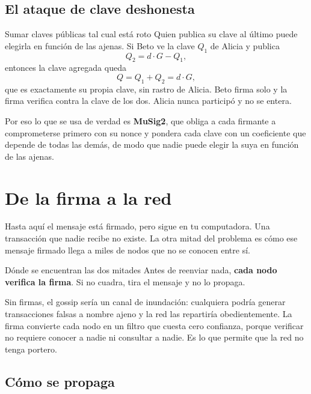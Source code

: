\documentclass[11pt,a4paper]{article}
\theoremstyle{definition}
\theoremstyle{plain}
\theoremstyle{remark}
\begin{document}
\subsection{El ataque de clave deshonesta}

\begin{aviso}{Sumar claves públicas tal cual está roto}
Quien publica su clave al último puede elegirla en función de las ajenas. Si Beto
ve la clave $Q_1$ de Alicia y publica
\[
  Q_2 = d\cdot G - Q_1,
\]
entonces la clave agregada queda
\[
  Q = Q_1 + Q_2 = d\cdot G,
\]
que es exactamente su propia clave, sin rastro de Alicia. Beto firma solo y la
firma verifica contra la clave de los dos. Alicia nunca participó y no se entera.
\end{aviso}

Por eso lo que se usa de verdad es \textbf{MuSig2}, que obliga a cada firmante a
comprometerse primero con su nonce y pondera cada clave con un coeficiente que
depende de todas las demás, de modo que nadie puede elegir la suya en función de
las ajenas.

\section{De la firma a la red}\label{sec:puente}

Hasta aquí el mensaje está firmado, pero sigue en tu computadora. Una transacción
que nadie recibe no existe. La otra mitad del problema es cómo ese mensaje
firmado llega a miles de nodos que no se conocen entre sí.

\begin{clave}{Dónde se encuentran las dos mitades}
Antes de reenviar nada, \textbf{cada nodo verifica la firma}. Si no cuadra, tira
el mensaje y no lo propaga.

Sin firmas, el gossip sería un canal de inundación: cualquiera podría generar
transacciones falsas a nombre ajeno y la red las repartiría obedientemente. La
firma convierte cada nodo en un filtro que cuesta cero confianza, porque
verificar no requiere conocer a nadie ni consultar a nadie. Es lo que permite que
la red no tenga portero.
\end{clave}

\subsection{Cómo se propaga}
\end{document}
